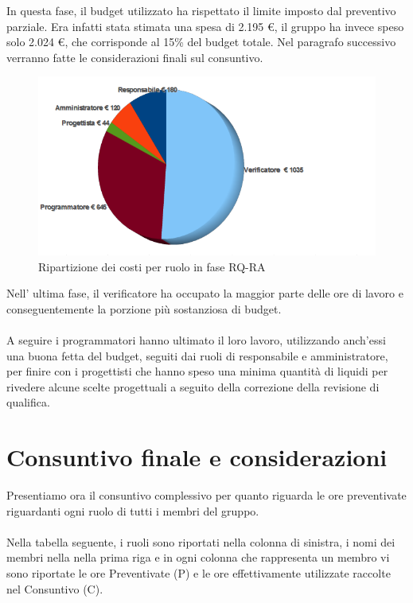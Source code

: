 In questa fase, il budget utilizzato ha rispettato il limite imposto dal
preventivo parziale. Era infatti stata stimata una spesa di 2.195 \euro, il
gruppo ha invece speso solo 2.024 \euro, che corrisponde al 15\% del budget totale. Nel
paragrafo successivo verranno fatte le considerazioni finali sul consuntivo.

\newpage
\begin{figure}[htbp!]
  \centering
  \includegraphics[width=13cm, angle=0]{img/PP/COSTI-RA.png}
\caption{Ripartizione dei costi per ruolo in fase RQ-RA}
\end{figure}
\vspace{0.5cm}


Nell' ultima fase, il verificatore ha occupato la maggior parte delle ore di
lavoro e conseguentemente la porzione pi\`u sostanziosa di budget.\\
\\
A seguire i programmatori hanno ultimato il loro lavoro, utilizzando anch'essi
una buona fetta del budget, seguiti dai ruoli di responsabile e amministratore,
per finire con i progettisti che hanno speso una minima quantit\`a di liquidi
per rivedere alcune scelte progettuali a seguito della correzione della
revisione di qualifica.

\newpage
\section{Consuntivo finale e considerazioni}

Presentiamo ora il consuntivo complessivo per quanto riguarda le ore
preventivate riguardanti ogni ruolo di tutti i membri del gruppo.\\
\\
Nella tabella seguente, i ruoli sono riportati nella colonna di sinistra, i nomi
dei membri nella nella prima riga e in ogni colonna che rappresenta un membro vi
sono riportate le ore Preventivate (P) e le ore effettivamente utilizzate
raccolte nel Consuntivo (C).

